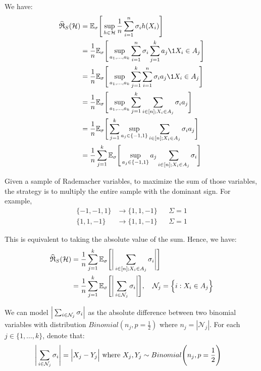 \begin{solution*}
    We have:
    \begin{align*}
        \ERC_S(\Hf) 
            &= \E_\sigma\biggSquare{
                \sup_{h\in \Hf} \frac{1}{n} \sum_{i=1}^n \sigma_i h(X_i)
            } \\
            &= \frac{1}{n} \E_\sigma\biggSquare{
                \sup_{a_1, \dots, a_k} \sum_{i=1}^n \sigma_i \sum_{j=1}^k a_j \1{X_i\in A_j}
            } \\
            &= \frac{1}{n} \E_\sigma\biggSquare{
                \sup_{a_1, \dots, a_k} \sum_{j=1}^k \sum_{i=1}^n \sigma_i a_j \1{X_i\in A_j}
            } \\
            &= \frac{1}{n} \E_\sigma\biggSquare{
                \sup_{a_1, \dots, a_k} \sum_{j=1}^k \sum_{i\in[n]; X_i \in A_j} \sigma_i a_j
            } \\
            &= \frac{1}{n} \E_\sigma\biggSquare{
                \sum_{j=1}^k \sup_{a_j\in\{-1, 1\}} \sum_{i\in[n]; X_i \in A_j} \sigma_i a_j
            } \\
            &= \frac{1}{n}\sum_{j=1}^k \E_\sigma\biggSquare{
                \sup_{a_j\in\{-1, 1\}} a_j \sum_{i\in[n]; X_i \in A_j} \sigma_i
            }
    \end{align*}

    \noindent Given a sample of Rademacher variables, to maximize the sum of those variables, the strategy is to multiply the entire sample with the dominant sign. For example,
    \begin{align*}
        \{-1, -1, 1\} &\to \{1, 1, -1\} &&\Sigma = 1 \\
        \{1, 1, -1\} &\to \{1, 1, -1\} &&\Sigma = 1
    \end{align*}

    \noindent This is equivalent to taking the absolute value of the sum. Hence, we have:
    \begin{align*}
        \widehat{\mathfrak{R}}_S(\mathcal{H}) 
            &= \frac{1}{n}\sum_{j=1}^k \mathbb{E}_\sigma\Bigg[ 
                \Bigg| 
                    \sum_{i\in[n]; X_i \in A_j} \sigma_i
                 \Bigg|
             \Bigg] \\
            &= \frac{1}{n}\sum_{j=1}^k \mathbb{E}_\sigma\Bigg[ 
                \Bigg| 
                    \sum_{i \in \mathcal{N}_j} \sigma_i
                 \Bigg|
             \Bigg], \ \ \ \mathcal{N}_j = \Big\{  i : X_i \in A_j  \Big\} 
    \end{align*}

    \noindent We can model $\Big| \sum_{i\in \mathcal{N}_j}\sigma_i \Big|$ as the absolute difference between two binomial variables with distribution $Binomial(n_j, p=\frac{1}{2})$ where $n_j=|\mathcal{N}_j|$. For each $j\in \{1, \dots, k\}$, denote that:
    \begin{align*}
        \Bigg| 
            \sum_{i \in \mathcal{N}_j} \sigma_i
         \Bigg| &= \Big|  X_j - Y_j  \Big| \text{ where } X_j, Y_j \sim Binomial\Bigg(n_j, p=\frac{1}{2}\Bigg)
    \end{align*}


\end{solution*}
